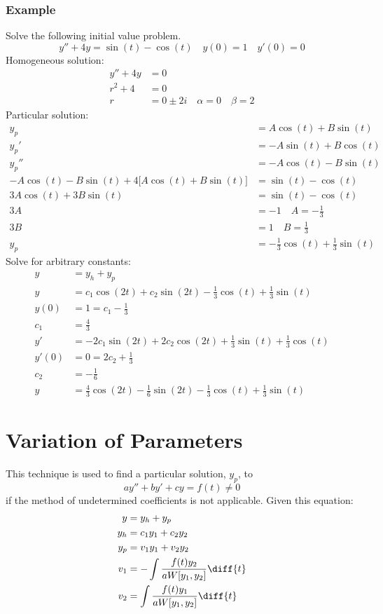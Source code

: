 \documentclass{math}
\begin{document}
\subsubsection*{Example}
Solve the following initial value problem.
\[ y''+4y = \sin(t)-\cos(t) \quad y(0) = 1 \quad y'(0) = 0 \]
Homogeneous solution:
\begin{align*}
  y''+4y &= 0 \\
  r^2+4 &= 0 \\
  r &= 0\pm2i \quad \alpha = 0 \quad \beta = 2
\end{align*}
Particular solution:
\begin{align*}
  y_p &= A\cos(t)+B\sin(t) \\
  y_p' &= -A\sin(t)+B\cos(t) \\
  y_p'' &= -A\cos(t)-B\sin(t) \\
  -A\cos(t)-B\sin(t)+4\bigg[A\cos(t)+B\sin(t)\bigg] &= \sin(t)-\cos(t) \\
  3A\cos(t)+3B\sin(t) &= \sin(t)-\cos(t) \\
  3A &= -1 \quad A = -\frac{1}{3} \\
  3B &= 1 \quad B = \frac{1}{3} \\
  y_p &= -\frac{1}{3}\cos(t)+\frac{1}{3}\sin(t)
\end{align*}
Solve for arbitrary constants:
\begin{align*}
  y &= y_h+y_p \\
  y &= c_1\cos(2t)+c_2\sin(2t)-\frac{1}{3}\cos(t)+\frac{1}{3}\sin(t) \\
  y(0) &= 1 = c_1-\frac{1}{3} \\
  c_1 &= \frac{4}{3} \\
  y' &= -2c_1\sin(2t)+2c_2\cos(2t)+\frac{1}{3}\sin(t)+\frac{1}{3}\cos(t) \\
  y'(0) &= 0 = 2c_2+\frac{1}{3} \\
  c_2 &= -\frac{1}{6} \\
  y &= \frac{4}{3}\cos(2t)-\frac{1}{6}\sin(2t)-\frac{1}{3}\cos(t)+
    \frac{1}{3}\sin(t)
\end{align*}

\clearpage
\section*{Variation of Parameters}
This technique is used to find a particular solution, \( y_p \), to
\[ ay''+by'+cy = f(t) \ne 0 \]
if the method of undetermined coefficients is not applicable. Given this
equation:
\begin{align*}
  y &= y_h+y_p \\
  y_h &= c_1y_1+c_2y_2 \\
  y_p &= v_1y_1+v_2y_2 \\
  v_1 &= -\int\frac{f(t)y_2}{aW[y_1,y_2]}\diff{t} \\
  v_2 &= \int\frac{f(t)y_1}{aW[y_1,y_2]}\diff{t}
\end{align*}
\end{document}
